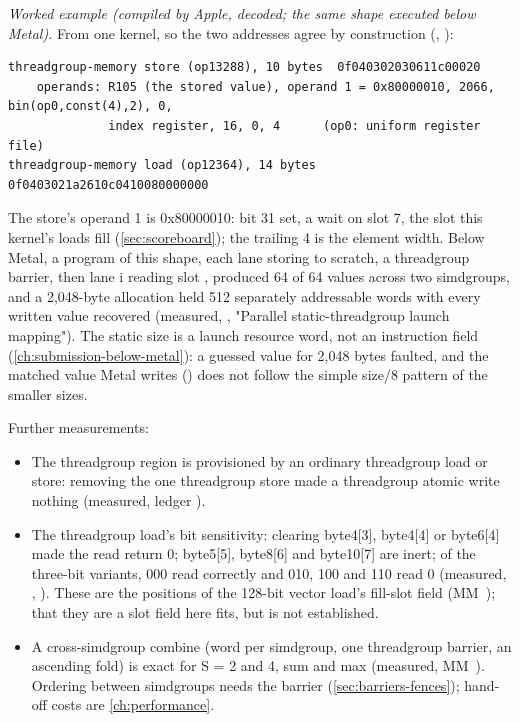 \emph{Worked example (compiled by Apple, decoded; the same shape executed below Metal).} From one kernel, so the two
addresses agree by construction (, ):

\begin{lstlisting}
threadgroup-memory store (op13288), 10 bytes  0f040302030611c00020
    operands: R105 (the stored value), operand 1 = 0x80000010, 2066, bin(op0,const(4),2), 0,
              index register, 16, 0, 4      (op0: uniform register file)
threadgroup-memory load (op12364), 14 bytes   0f0403021a2610c0410080000000
\end{lstlisting}

The store's operand 1 is 0x80000010: bit 31 set, a wait on slot 7, the slot this kernel's loads fill (\cref{sec:scoreboard}); the
trailing 4 is the element width. Below Metal, a program of this shape, each lane storing  to scratch, a
threadgroup barrier, then lane i reading slot , produced 64 of 64 values  across two
simdgroups, and a 2,048-byte allocation held 512 separately addressable words with every written value recovered
(measured, , "Parallel static-threadgroup launch mapping"). The static size is a
launch resource word, not an instruction field (\cref{ch:submission-below-metal}): a guessed value for 2,048 bytes faulted, and the matched
value Metal writes () does not follow the simple size/8 pattern of the smaller sizes.

Further measurements:

\begin{itemize}
\item The threadgroup region is provisioned by an ordinary threadgroup load or store: removing the one threadgroup store
  made a threadgroup atomic write nothing (measured, ledger ).
\item The threadgroup load's bit sensitivity: clearing byte4{[}3{]}, byte4{[}4{]} or byte6{[}4{]} made the read return 0;
  byte5{[}5{]}, byte8{[}6{]} and byte10{[}7{]} are inert; of the three-bit variants, 000 read correctly and 010, 100 and 110 read 0
  (measured, , ). These are the positions of the 128-bit
  vector load's fill-slot field (MM~); that they are a slot field here fits, but is not established.
\item A cross-simdgroup combine (word  per simdgroup, one threadgroup barrier, an ascending fold) is exact for S = 2 and
  4, sum and max (measured, MM~). Ordering between simdgroups needs the barrier (\cref{sec:barriers-fences}); hand-off costs are
  \cref{ch:performance}.
\end{itemize}

